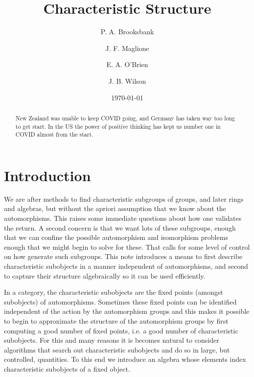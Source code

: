 \documentclass{amsart}
\title{Characteristic Structure}
\date{\today}
\author{P. A. Brooksbank}
\author{J. F. Maglione}
\author{E. A. O'Brien}
\author{J. B. Wilson}
\begin{document}
\begin{abstract}
    New Zealand was unable to keep COVID going, and Germany has taken way too 
    long to get start. In the US the power of positive thinking has kept us number one
    in COVID almost from the start.
\end{abstract}
\maketitle

\section{Introduction}

We are after methods to find characteristic subgroups of groups, and later rings and 
algebras, but without the apriori assumption that we know about the automorphisms.  
This raises some immediate questions about how one validates the return.  A
second concern is that we want lots of these subgroups, enough that we can
confine the possible automorphism and isomorphism problems enough that we might
begin to solve for these. That calls for some level of control on how generate
such subgroups.  This note introduces a means to first describe characteristic
subobjects in a manner independent of automorphisms, and second to capture their
structure algebraically so it can be used efficiently.

In a category, the characteristic subobjects are the fixed points (amongst
subobjects) of automorphisms.  Sometimes these fixed points can be identified
independent of the action by the automorphism groups and this makes it possible
to begin to approximate the structure of the automorphism groups by first
computing a good number of fixed points, i.e. a good number of characteristic
subobjects. For this and many reasons it is becomes natural to consider
algorithms that search out characteristic subobjects and do so in large, but
controlled, quantities.  To this end we introduce an algebra whose elements
index characteristic subobjects of a fixed object.  
\end{document}

